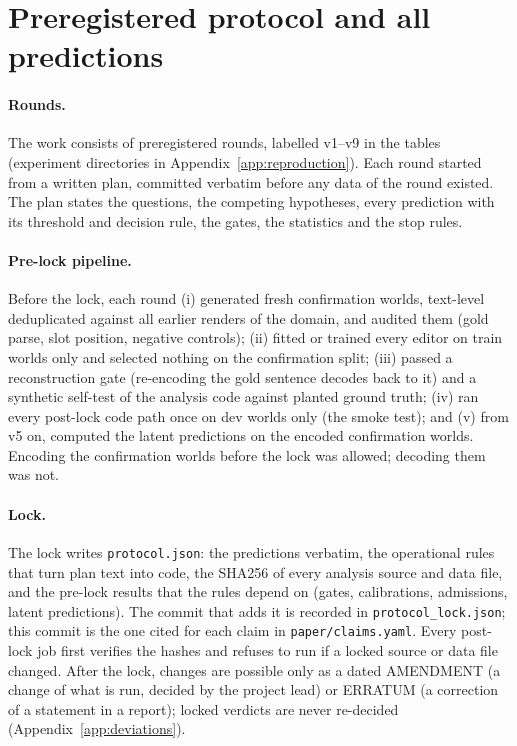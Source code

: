 \section{Preregistered protocol and all predictions}\label{app:protocol}
\paragraph{Rounds.}
The work consists of \CLmetaRounds{} preregistered rounds, labelled v1--v9 in the tables (experiment directories in Appendix~\ref{app:reproduction}).
Each round started from a written plan, committed verbatim before any data of the round existed. The plan states the questions, the
competing hypotheses, every prediction with its threshold and decision rule, the gates, the statistics and the stop rules.

\paragraph{Pre-lock pipeline.}
Before the lock, each round (i) generated fresh confirmation worlds, text-level deduplicated against all earlier renders of the domain,
and audited them (gold parse, slot position, negative controls); (ii) fitted or trained every editor on train worlds only and selected
nothing on the confirmation split; (iii) passed a reconstruction gate (re-encoding the gold sentence decodes back to it) and a synthetic
self-test of the analysis code against planted ground truth; (iv) ran every post-lock code path once on dev worlds only (the smoke test);
and (v) from v5 on, computed the latent predictions on the encoded confirmation worlds. Encoding the confirmation worlds before the lock
was allowed; decoding them was not.

\paragraph{Lock.}
The lock writes \texttt{protocol.json}: the predictions verbatim, the operational rules that turn plan text into code, the SHA256 of every
analysis source and data file, and the pre-lock results that the rules depend on (gates, calibrations, admissions, latent predictions).
The commit that adds it is recorded in \texttt{protocol\_lock.json}; this commit is the one cited for each claim in
\texttt{paper/claims.yaml}. Every post-lock job first verifies the hashes and refuses to run if a locked source or data file changed.
After the lock, changes are possible only as a dated AMENDMENT (a change of what is run, decided by the project lead) or ERRATUM (a
correction of a statement in a report); locked verdicts are never re-decided (Appendix~\ref{app:deviations}).

